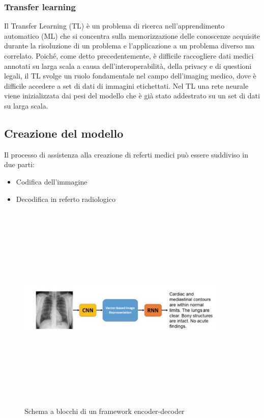 \documentclass[12pt,a4paper]{report}
\begin{document}
\subsubsection{Transfer learning}
Il Transfer Learning (TL) \cite{singh2019chest} è un problema di ricerca nell'apprendimento automatico (ML) che si concentra sulla memorizzazione delle conoscenze acquisite durante la risoluzione di un problema e l'applicazione a un problema diverso ma correlato.
Poiché, come detto precedentemente, è difficile raccogliere dati medici annotati su larga scala a causa dell'interoperabilità, della privacy e di questioni legali, il TL svolge un ruolo fondamentale nel campo dell'imaging medico, dove è difficile accedere a set di dati di immagini etichettati. Nel TL una rete neurale viene inizializzata dai pesi del modello che è già stato addestrato su un set di dati su larga scala.\\

\subsection{Creazione del modello}
Il processo di assistenza alla creazione di referti medici può essere suddiviso in due parti:
\begin{itemize}
    \item Codifica dell’immagine
    \item Decodifica in referto radiologico
\end{itemize}

\begin{figure}[h!]
    \begin{center}
        \includegraphics[width=10cm,height=10cm,keepaspectratio]{Encoder-Decoder}
    \end{center}
    \caption{Schema a blocchi di un framework encoder-decoder}
    \label{fig:econder-decoder}
\end{figure}
\end{document}
